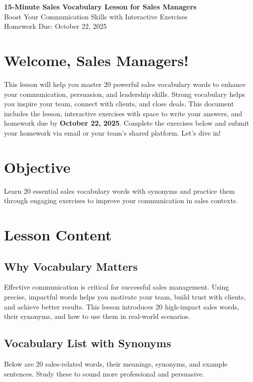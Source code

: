 \documentclass[11pt, a4paper]{article}
\begin{document}
\begin{center}
    \textbf{\Large 15-Minute Sales Vocabulary Lesson for Sales Managers} \\
    \vspace{0.2cm}
    \normalsize Boost Your Communication Skills with Interactive Exercises \\
    \vspace{0.1cm}
    \normalsize Homework Due: October 22, 2025
\end{center}

\section*{Welcome, Sales Managers!}
This lesson will help you master 20 powerful sales vocabulary words to enhance your communication, persuasion, and leadership skills. Strong vocabulary helps you inspire your team, connect with clients, and close deals. This document includes the lesson, interactive exercises with space to write your answers, and homework due by \textbf{October 22, 2025}. Complete the exercises below and submit your homework via email or your team’s shared platform. Let’s dive in!

\section*{Objective}
Learn 20 essential sales vocabulary words with synonyms and practice them through engaging exercises to improve your communication in sales contexts.

\section{Lesson Content}

\subsection{Why Vocabulary Matters}
Effective communication is critical for successful sales management. Using precise, impactful words helps you motivate your team, build trust with clients, and achieve better results. This lesson introduces 20 high-impact sales words, their synonyms, and how to use them in real-world scenarios.

\subsection{Vocabulary List with Synonyms}
Below are 20 sales-related words, their meanings, synonyms, and example sentences. Study these to sound more professional and persuasive.
\end{document}
